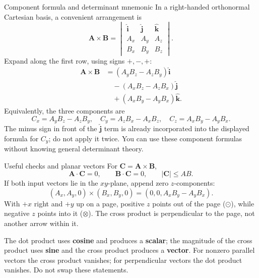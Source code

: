 \documentclass[11pt,letterpaper]{article}
\newcommand{\vect}[1]{\boldsymbol{#1}}
\newcommand{\uv}[1]{\hat{\boldsymbol{#1}}}
\begin{document}
\begin{derivbox}{Component formula and determinant mnemonic}
In a right-handed orthonormal Cartesian basis, a convenient arrangement is
\[
 \vect A\times\vect B=
 \begin{vmatrix}
 \uv i&\uv j&\uv k\\
 A_x&A_y&A_z\\
 B_x&B_y&B_z
 \end{vmatrix}.
\]
Expand along the first row, using signs $+,-,+$:
\begin{align*}
 \vect A\times\vect B
 &=(A_yB_z-A_zB_y)\uv i\\
 &\quad-(A_xB_z-A_zB_x)\uv j\\
 &\quad+(A_xB_y-A_yB_x)\uv k.
\end{align*}
Equivalently, the three components are
\[
 \boxed{C_x=A_yB_z-A_zB_y,\quad
 C_y=A_zB_x-A_xB_z,\quad C_z=A_xB_y-A_yB_x.}
\]
The minus sign in front of the $\uv j$ term is already incorporated into the displayed formula for $C_y$; do not apply it twice. You can use these component formulas without knowing general determinant theory.
\end{derivbox}

\begin{rulebox}{Useful checks and planar vectors}
For $\vect C=\vect A\times\vect B$,
\[
 \vect A\cdot\vect C=0,\qquad\vect B\cdot\vect C=0,
 \qquad |\vect C|\leq AB.
\]
If both input vectors lie in the $xy$-plane, append zero $z$-components:
\[
 (A_x,A_y,0)\times(B_x,B_y,0)=(0,0,A_xB_y-A_yB_x).
\]
With $+x$ right and $+y$ up on a page, positive $z$ points out of the page ($\odot$), while negative $z$ points into it ($\otimes$). The cross product is perpendicular to the page, not another arrow within it.
\end{rulebox}

\begin{watchbox}
The dot product uses \textbf{cosine} and produces a \textbf{scalar}; the magnitude of the cross product uses \textbf{sine} and the cross product produces a \textbf{vector}. For nonzero parallel vectors the cross product vanishes; for perpendicular vectors the dot product vanishes. Do not swap these statements.
\end{watchbox}

\newpage
\end{document}
